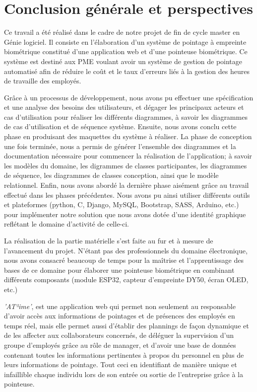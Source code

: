 \chapter*{Conclusion générale et perspectives}

Ce travail a été réalisé dans le cadre de notre projet de fin de cycle master en
Génie logiciel. Il consiste en l'élaboration d'un système de pointage à
empreinte biométrique constitué d'une application web et d'une pointeuse
biométrique. Ce système est destiné aux PME voulant avoir un système de gestion
de pointage automatisé afin de réduire le coût et le taux d'erreurs liés à la
gestion des heures de travaille des employés.

Grâce à un processus de développement, nous avons pu effectuer une spécification
et une analyse des besoins des utilisateurs, et dégager les principaux
acteurs et cas d'utilisation pour réaliser les différents diagrammes, à savoir
les diagrammes de cas d'utilisation et de séquence système. Ensuite, nous avons
conclu cette phase en produisant des maquettes du système à réaliser. La phase
de conception une fois terminée, nous a permis de générer l'ensemble des
diagrammes et la documentation nécessaire pour commencer la réalisation de
l'application; à savoir les modèles du domaine,  les digrammes de classes
participantes, les diagrammes de séquence, les diagrammes de classes conception,
ainsi que le modèle relationnel. Enfin, nous avons abordé la dernière phase
aisément grâce au travail effectué dans les phases précédentes. Nous avons pu
ainsi utiliser différents outils et plateformes (python, C, Django, MySQL,
Bootstrap, SASS, Arduino, etc.) pour implémenter notre solution que nous avons
dotée d'une identité graphique reflétant le domaine d'activité de celle-ci.

La réalisation de la partie matérielle s'est faite au fur et à mesure de
l'avancement du projet. N’étant pas des professionnels du domaine électronique,
nous avons consacré beaucoup de temps pour la maîtrise et l'apprentissage des
bases de ce domaine pour élaborer une pointeuse biométrique en combinant
différents composants (module ESP32, capteur d'empreinte DY50, écran OLED, etc.)   

\emph{'AT²ime'}, est une application web qui permet non seulement au responsable
d'avoir accès aux informations de pointages et de présences des employés en temps
réel, mais elle permet aussi d'établir des plannings de façon dynamique et de
les affecter aux collaborateurs concernés, de déléguer la supervision d'un
groupe d'employés grâce au rôle de manager, et d'avoir une base de données
contenant toutes les informations pertinentes à propos du personnel en plus de
leurs informations de pointage. Tout ceci en identifiant de manière
unique et infaillible chaque individu lors de son entrée ou sortie de
l'entreprise grâce à la pointeuse.   

